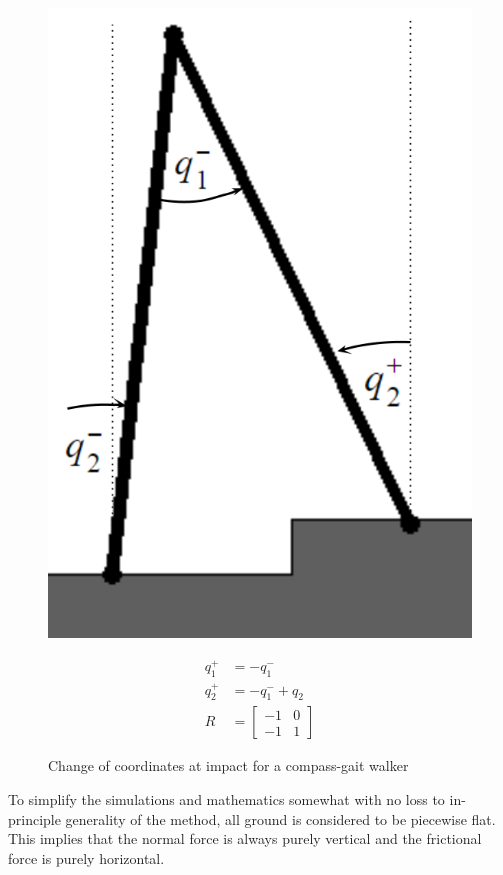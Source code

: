 \begin{figure}[htp]
\centering
\begin{minipage}{0.45\linewidth}
\centering
	\includegraphics[width=0.7\linewidth]{3TechBackground/impact.png}
	\caption{Change of coordinates at impact for a compass-gait walker}
	\label{fig:relabelimpact}
\end{minipage}
\hspace{0.5cm}
\begin{minipage}{0.45\linewidth}
\begin{align*}
	q_1^+ &= -q_1^- \\
	q_2^+ &= -q_1^- + q_2 \\
	R &= \begin{bmatrix}
		-1	& 	0	\\
		-1	&	1
	\end{bmatrix}
\end{align*}
\end{minipage}
\end{figure}

To simplify the simulations and mathematics somewhat with no loss to in-principle generality of the method, all ground is considered to be piecewise flat. This implies that the normal force is always purely vertical and the frictional force is purely horizontal.


